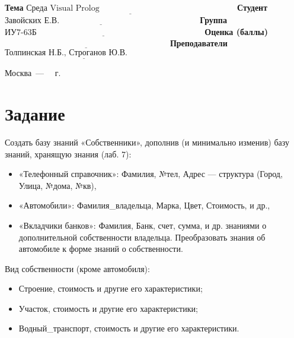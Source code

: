 \documentclass[12pt]{report}
\begin{document}
\begin{titlepage}
		\noindent\textbf{Тема} $\underline{\text{Среда Visual Prolog~~~~~~~~~~~~~~~~~~~~~~~~~~~~~~~~~~~~~~~~~~~~~~~~~}}$\newline\newline
		\noindent\textbf{Студент} $\underline{\text{Завойских Е.В.~~~~~~~~~~~~~~~~~~~~~~~~~~~~~~~~~~~~~~~~~~~~~~~~~~}}$\newline\newline
		\noindent\textbf{Группа} $\underline{\text{ИУ7-63Б~~~~~~~~~~~~~~~~~~~~~~~~~~~~~~~~~~~~~~~~~~~~~~~~~~~~~~~~~~~~}}$\newline\newline
		\noindent\textbf{Оценка (баллы)} $\underline{\text{~~~~~~~~~~~~~~~~~~~~~~~~~~~~~~~~~~~~~~~~~~~~~~~~~~~~~~~~~~~}}$\newline\newline
		\noindent\textbf{Преподаватели} $\underline{\text{Толпинская Н.Б., Строганов Ю.В.~~~~~~~~~~~~~}}$\newline\newline\newline
		
		\begin{center}
			\vfill
			Москва~---~\the\year
			~г.
		\end{center}
	\end{titlepage}
		

\section*{Задание}

Создать базу знаний «Собственники», дополнив (и минимально изменив) базу
знаний, хранящую знания (лаб. 7):

\begin{itemize}
    \item «Телефонный справочник»: Фамилия, №тел, Адрес --- структура (Город, Улица, №дома, №кв),
    \item «Автомобили»: Фамилия\_владельца, Марка, Цвет, Стоимость, и др.,
    \item «Вкладчики банков»: Фамилия, Банк, счет, сумма, и др. знаниями о дополнительной собственности владельца. Преобразовать знания об автомобиле к форме знаний о собственности.
\end{itemize}

Вид собственности (кроме автомобиля):

\begin{itemize}
    \item Строение, стоимость и другие его характеристики;
    \item Участок, стоимость и другие его характеристики;
    \item Водный\_транспорт, стоимость и другие его характеристики.
\end{itemize}
\end{document}
